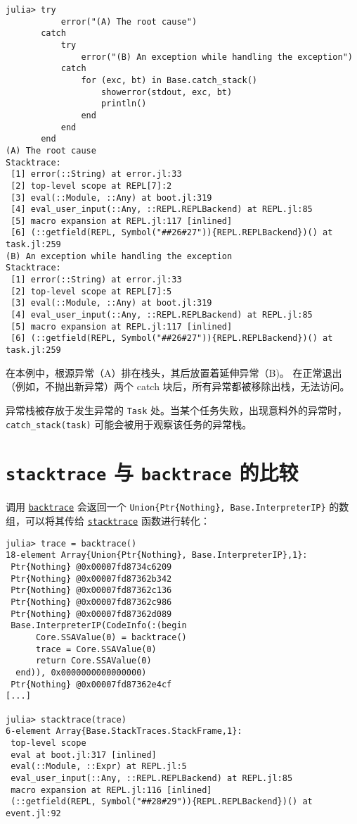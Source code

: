 \begin{verbatim}
julia> try
           error("(A) The root cause")
       catch
           try
               error("(B) An exception while handling the exception")
           catch
               for (exc, bt) in Base.catch_stack()
                   showerror(stdout, exc, bt)
                   println()
               end
           end
       end
(A) The root cause
Stacktrace:
 [1] error(::String) at error.jl:33
 [2] top-level scope at REPL[7]:2
 [3] eval(::Module, ::Any) at boot.jl:319
 [4] eval_user_input(::Any, ::REPL.REPLBackend) at REPL.jl:85
 [5] macro expansion at REPL.jl:117 [inlined]
 [6] (::getfield(REPL, Symbol("##26#27")){REPL.REPLBackend})() at task.jl:259
(B) An exception while handling the exception
Stacktrace:
 [1] error(::String) at error.jl:33
 [2] top-level scope at REPL[7]:5
 [3] eval(::Module, ::Any) at boot.jl:319
 [4] eval_user_input(::Any, ::REPL.REPLBackend) at REPL.jl:85
 [5] macro expansion at REPL.jl:117 [inlined]
 [6] (::getfield(REPL, Symbol("##26#27")){REPL.REPLBackend})() at task.jl:259
\end{verbatim}



在本例中，根源异常（A）排在栈头，其后放置着延伸异常（B)。 在正常退出（例如，不抛出新异常）两个 catch 块后，所有异常都被移除出栈，无法访问。



异常栈被存放于发生异常的 \texttt{Task} 处。当某个任务失败，出现意料外的异常时，\texttt{catch\_stack(task)} 可能会被用于观察该任务的异常栈。



\hypertarget{9581632785664784530}{}


\section{\texttt{stacktrace} 与 \texttt{backtrace} 的比较}



调用 \hyperlink{6187626674327343338}{\texttt{backtrace}} 会返回一个 \texttt{Union\{Ptr\{Nothing\}, Base.InterpreterIP\}} 的数组，可以将其传给 \hyperlink{11964270650763140298}{\texttt{stacktrace}} 函数进行转化：




\begin{verbatim}
julia> trace = backtrace()
18-element Array{Union{Ptr{Nothing}, Base.InterpreterIP},1}:
 Ptr{Nothing} @0x00007fd8734c6209
 Ptr{Nothing} @0x00007fd87362b342
 Ptr{Nothing} @0x00007fd87362c136
 Ptr{Nothing} @0x00007fd87362c986
 Ptr{Nothing} @0x00007fd87362d089
 Base.InterpreterIP(CodeInfo(:(begin
      Core.SSAValue(0) = backtrace()
      trace = Core.SSAValue(0)
      return Core.SSAValue(0)
  end)), 0x0000000000000000)
 Ptr{Nothing} @0x00007fd87362e4cf
[...]

julia> stacktrace(trace)
6-element Array{Base.StackTraces.StackFrame,1}:
 top-level scope
 eval at boot.jl:317 [inlined]
 eval(::Module, ::Expr) at REPL.jl:5
 eval_user_input(::Any, ::REPL.REPLBackend) at REPL.jl:85
 macro expansion at REPL.jl:116 [inlined]
 (::getfield(REPL, Symbol("##28#29")){REPL.REPLBackend})() at event.jl:92
\end{verbatim}




